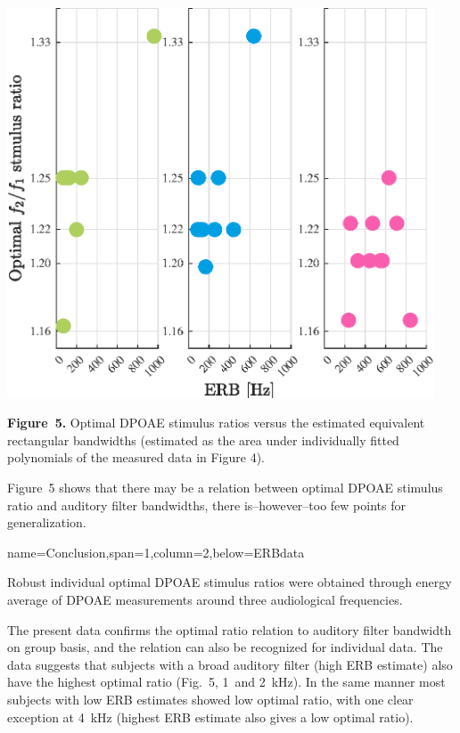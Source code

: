 \documentclass[paperwidth=100cm,paperheight=160cm,portrait,fontscale=0.2941]{baposter}
\begin{document}
\begin{poster}
{\begin{flushright}
\includegraphics[width=0.95\textwidth]{ScatterBEAR.eps}
\end{flushright}
\vspace{-15pt}
\textbf{Figure~5.} Optimal DPOAE stimulus ratios versus the estimated equivalent rectangular bandwidths (estimated as the area under individually fitted polynomials of the measured data in Figure 4).


Figure~5 shows that there may be a relation between optimal DPOAE stimulus ratio and auditory filter bandwidths, there is--however--too few points for generalization.

}


{name=Conclusion,span=1,column=2,below=ERBdata}
{\parskip 5pt
Robust individual optimal DPOAE stimulus ratios were obtained through energy average of DPOAE measurements around three audiological frequencies. %

The present data confirms the optimal ratio relation to auditory filter bandwidth on group basis, and the relation can also be recognized for individual data. The data suggests that subjects with a broad auditory filter (high ERB estimate) also have the highest optimal ratio (Fig.~5, 1~and 2~kHz). In the same manner most subjects with low ERB estimates showed low optimal ratio, with one clear exception at 4~kHz (highest ERB estimate also gives a low optimal ratio).



}
\end{poster}
\end{document}
